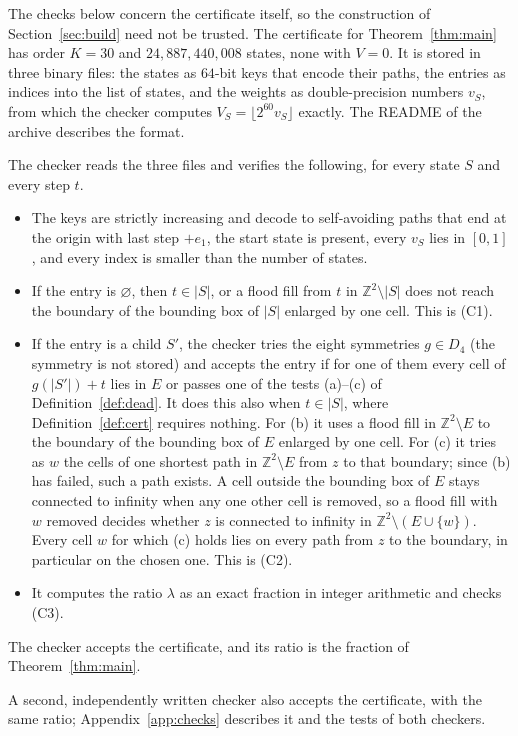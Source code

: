 \documentclass[11pt]{amsart}
\theoremstyle{definition}
\theoremstyle{remark}
\numberwithin{equation}{section}
\newcommand{\Z}{\mathbb{Z}}
\newcommand{\Kmax}{30}
\newcommand{\NStates}{24{,}887{,}440{,}008}
\begin{document}
The checks below concern the certificate itself, so the construction of Section~\ref{sec:build} need not be trusted. The certificate for Theorem~\ref{thm:main} has order $K=\Kmax$ and $\NStates$ states, none with $V=0$. It is stored in three binary files: the states as $64$-bit keys that encode their paths, the entries as indices into the list of states, and the weights as double-precision numbers $v_S$, from which the checker computes $V_S=\lfloor2^{60}v_S\rfloor$ exactly. The README of the archive describes the format.

The checker reads the three files and verifies the following, for every state $S$ and every step $t$.
\begin{itemize}[leftmargin=*]
\item The keys are strictly increasing and decode to self-avoiding paths that end at the origin with last step $+e_1$, the start state is present, every $v_S$ lies in $[0,1]$, and every index is smaller than the number of states.
\item If the entry is $\varnothing$, then $t\in|S|$, or a flood fill from $t$ in $\Z^2\setminus|S|$ does not reach the boundary of the bounding box of $|S|$ enlarged by one cell. This is (C1).
\item If the entry is a child $S'$, the checker tries the eight symmetries $g\in D_4$ (the symmetry is not stored) and accepts the entry if for one of them every cell of $g(|S'|)+t$ lies in $E$ or passes one of the tests (a)--(c) of Definition~\ref{def:dead}. It does this also when $t\in|S|$, where Definition~\ref{def:cert} requires nothing. For (b) it uses a flood fill in $\Z^2\setminus E$ to the boundary of the bounding box of $E$ enlarged by one cell. For (c) it tries as $w$ the cells of one shortest path in $\Z^2\setminus E$ from $z$ to that boundary; since (b) has failed, such a path exists. A cell outside the bounding box of $E$ stays connected to infinity when any one other cell is removed, so a flood fill with $w$ removed decides whether $z$ is connected to infinity in $\Z^2\setminus(E\cup\{w\})$. Every cell $w$ for which (c) holds lies on every path from $z$ to the boundary, in particular on the chosen one. This is (C2).
\item It computes the ratio $\lambda$ as an exact fraction in integer arithmetic and checks (C3).
\end{itemize}
The checker accepts the certificate, and its ratio is the fraction of Theorem~\ref{thm:main}.

A second, independently written checker also accepts the certificate, with the same ratio; Appendix~\ref{app:checks} describes it and the tests of both checkers.
\end{document}
